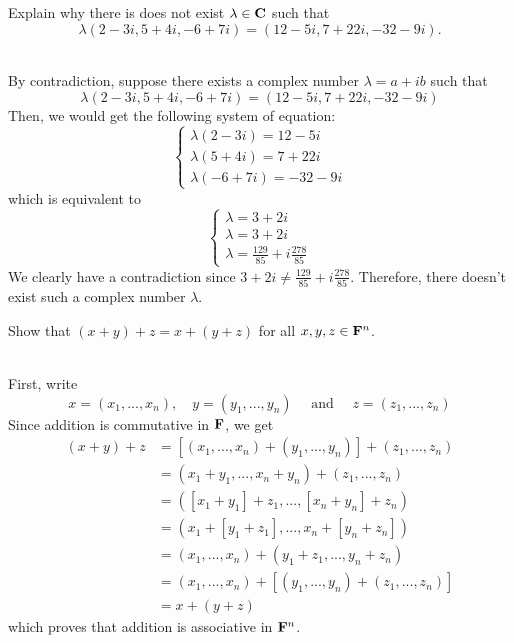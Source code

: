 \begin{exercise}
    Explain why there is does not exist $\lambda \in \mathbf{C}$ such that
    $$\lambda (2 - 3i, 5 + 4i, -6 + 7i) = (12 - 5i, 7 + 22i, -32 -9i).$$
\end{exercise}

\begin{solution}
    \\ By contradiction, suppose there exists a complex number $\lambda = a + ib$ such that
    $$\lambda (2 - 3i, 5 + 4i, -6 + 7i) = (12 - 5i, 7 + 22i, -32 -9i)$$
    Then, we would get the following system of equation:
    $$\begin{cases}
        \lambda(2 - 3i) = 12 - 5i \\ \lambda(5 + 4i) = 7 + 22i \\ \lambda(-6 + 7i) = -32 - 9i
    \end{cases}$$
    which is equivalent to
    $$\begin{cases}
        \lambda = 3 + 2i \\ \lambda = 3 + 2i \\ \lambda = \frac{129}{85} + i\frac{278}{85}
    \end{cases}$$
    We clearly have a contradiction since $3 + 2i \neq \frac{129}{85} + i\frac{278}{85}$. Therefore, there doesn't exist such a complex number $\lambda$.\\
\end{solution}

\begin{exercise}
    Show that $(x + y) + z = x + (y + z)$ for all $x,y,z \in \mathbf{F}^n$. \\
\end{exercise}

\begin{solution}
    \\ First, write
    $$x = (x_1, ..., x_n), \quad y = (y_1, ..., y_n) \quad \text{ and } \quad z = (z_1, ..., z_n)$$
    Since addition is commutative in $\mathbf{F}$, we get
    \begin{align*}
        (x + y) + z &= [(x_1, ..., x_n) + (y_1, ..., y_n)] + (z_1, ..., z_n) \\
        &= (x_1 + y_1, ..., x_n + y_n) + (z_1, ..., z_n) \\
        &= ([x_1 + y_1] + z_1, ..., [x_n + y_n] + z_n) \\
        &= (x_1 + [y_1 + z_1], ..., x_n + [y_n + z_n]) \\
        &= (x_1, ..., x_n) + (y_1 + z_1, ..., y_n + z_n) \\
        &= (x_1, ..., x_n) + [(y_1, ..., y_n) + (z_1, ..., z_n)] \\
        &= x + (y+z)
    \end{align*}
    which proves that addition is associative in $\mathbf{F}^n$.\\
\end{solution}

